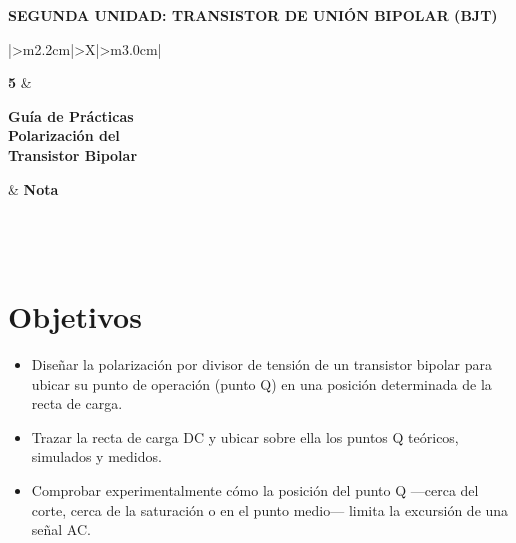 \documentclass[11pt,a4paper]{article}
\begin{document}
\begin{center}
    {\normalsize\bfseries SEGUNDA UNIDAD: TRANSISTOR DE UNIÓN BIPOLAR (BJT)}
\end{center}

\vspace{0.55cm}

\begingroup
\renewcommand{\tabularxcolumn}[1]{m{#1}}
\renewcommand{\arraystretch}{2.0}
\setlength{\tabcolsep}{12pt}
\noindent
\begin{tabularx}{\textwidth}{|>{\centering\arraybackslash}m{2.2cm}|>{\centering\arraybackslash}X|>{\centering\arraybackslash}m{3.0cm}|}
\hline
\rule{0pt}{2.1cm}{\fontsize{58}{58}\selectfont\bfseries 5}
    & \begin{minipage}[c]{\linewidth}\centering
          {\large\bfseries Guía de Prácticas}\\[7pt]
          {\Large\bfseries Polarización del\\ Transistor Bipolar}
      \end{minipage}
    & {\Large\bfseries Nota}\\
\hline
{}\\
\hline
{}\\
\\
\hline
\end{tabularx}
\endgroup

\vspace{0.8cm}

\section{Objetivos}
\begin{itemize}
    \item Diseñar la polarización por divisor de tensión de un transistor bipolar para
          ubicar su punto de operación (punto Q) en una posición determinada de la recta de
          carga.
    \item Trazar la recta de carga DC y ubicar sobre ella los puntos Q teóricos, simulados
          y medidos.
    \item Comprobar experimentalmente cómo la posición del punto Q ---cerca del corte, cerca
          de la saturación o en el punto medio--- limita la excursión de una señal AC.
\end{itemize}
\end{document}
